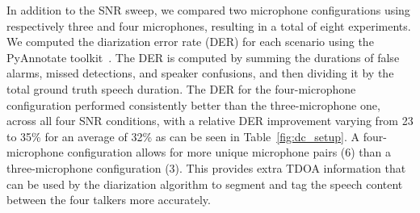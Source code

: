 In addition to the SNR sweep, we compared two microphone configurations using respectively three and four microphones, resulting in a total of eight experiments. We computed the diarization error rate (DER) for each scenario using the PyAnnotate toolkit~\cite{Bredin2020}. %
The DER is computed by summing the durations of false alarms, missed detections, and speaker confusions, and then dividing it by the total ground truth speech duration. The DER for the four-microphone configuration performed consistently better than the three-microphone one, across all four SNR conditions, with a relative DER improvement varying from 23 to 35\% for an average of 32\% as can be seen in Table~\ref{fig:dc_setup}. A four-microphone configuration allows for more unique microphone pairs (6) than a three-microphone configuration (3). This provides extra TDOA information that can be used by the diarization algorithm to segment and tag the speech content between the four talkers more accurately.




